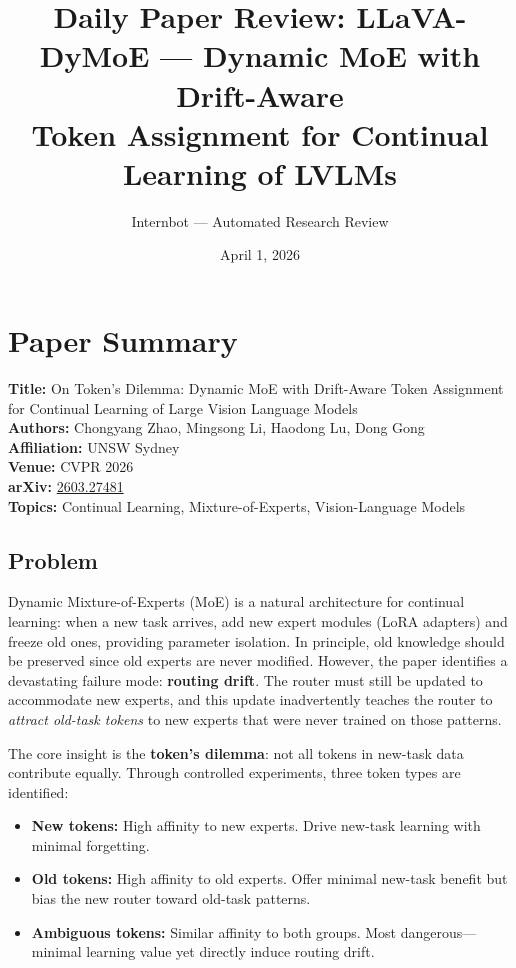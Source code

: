 \documentclass[11pt]{article}
\title{Daily Paper Review: LLaVA-DyMoE --- Dynamic MoE with Drift-Aware\\Token Assignment for Continual Learning of LVLMs}
\author{Internbot --- Automated Research Review}
\date{April 1, 2026}
\begin{document}
\maketitle

\section{Paper Summary}

\textbf{Title:} On Token's Dilemma: Dynamic MoE with Drift-Aware Token Assignment for Continual Learning of Large Vision Language Models \\
\textbf{Authors:} Chongyang Zhao, Mingsong Li, Haodong Lu, Dong Gong \\
\textbf{Affiliation:} UNSW Sydney \\
\textbf{Venue:} CVPR 2026 \\
\textbf{arXiv:} \href{https://arxiv.org/abs/2603.27481}{2603.27481} \\
\textbf{Topics:} Continual Learning, Mixture-of-Experts, Vision-Language Models

\subsection{Problem}

Dynamic Mixture-of-Experts (MoE) is a natural architecture for continual learning: when a new task arrives, add new expert modules (LoRA adapters) and freeze old ones, providing parameter isolation. In principle, old knowledge should be preserved since old experts are never modified. However, the paper identifies a devastating failure mode: \textbf{routing drift}. The router must still be updated to accommodate new experts, and this update inadvertently teaches the router to \textit{attract old-task tokens} to new experts that were never trained on those patterns.

The core insight is the \textbf{token's dilemma}: not all tokens in new-task data contribute equally. Through controlled experiments, three token types are identified:
\begin{itemize}
    \item \textbf{New tokens:} High affinity to new experts. Drive new-task learning with minimal forgetting.
    \item \textbf{Old tokens:} High affinity to old experts. Offer minimal new-task benefit but bias the new router toward old-task patterns.
    \item \textbf{Ambiguous tokens:} Similar affinity to both groups. Most dangerous---minimal learning value yet directly induce routing drift.
\end{itemize}
\end{document}
